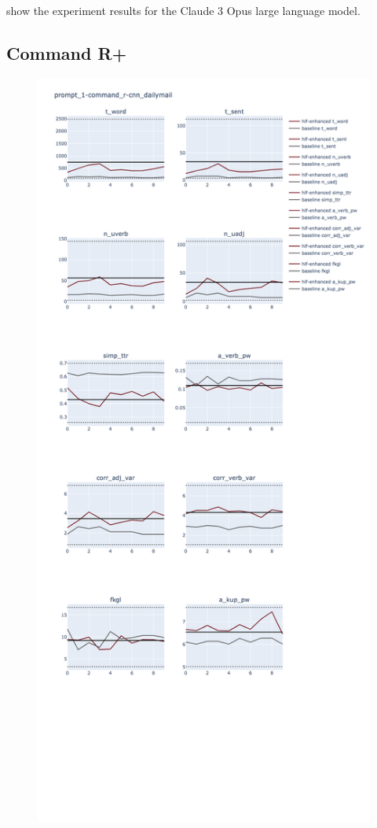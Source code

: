 \documentclass[11pt]{article}
\begin{document}
show the experiment results for the Claude 3 Opus large language model.

\subsection{Command R+}

\begin{figure}[ht]
    \includegraphics[width=\textwidth,height=0.9\textheight,scale=1]{plots/prompt_1/prompt_1-command_r-cnn_dailymail/prompt_1-command_r-cnn_dailymail.png}

\end{figure}
\end{document}
